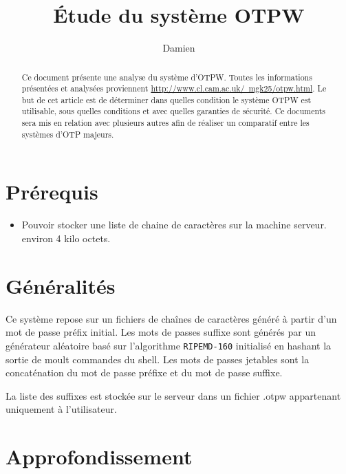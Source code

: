 \documentclass{../res/univ-projet}
\title{\'Etude du syst\`eme OTPW}
\author{Damien \bsc{PICARD}}
\begin{document}
\maketitle

\begin{abstract}
    Ce document présente une analyse du système d'OTPW. Toutes les
    informations présentées et analysées proviennent 
    \hyperref[de ce site]{http://www.cl.cam.ac.uk/~mgk25/otpw.html}. Le
    but de cet
    article est de déterminer dans quelles condition le
    système OTPW est utilisable, sous quelles conditions et avec quelles garanties
    de sécurité.
    Ce documents sera mis en relation avec plusieurs autres afin de réaliser un
    comparatif entre les systèmes d'OTP majeurs.
\end{abstract}
\newpage
\tableofcontents
\newpage

\section{Prérequis}
\begin{itemize}
    \item Pouvoir stocker une liste de chaine de caractères sur la machine serveur.
        environ 4 kilo octets. 
\end{itemize}

\section{Généralités}
Ce système repose sur un fichiers de chaînes de caractères généré à partir
d'un mot de passe préfix initial. Les mots de passes suffixe sont générés par un
générateur aléatoire basé sur l'algorithme \verb?RIPEMD-160? initialisé en
hashant la sortie de moult commandes du shell. Les mots de passes jetables sont
la concaténation du mot de passe préfixe et du mot de passe suffixe.

La liste des suffixes est stockée sur le serveur dans un fichier .otpw
appartenant uniquement à l'utilisateur.

\section{Approfondissement}
\end{document}
